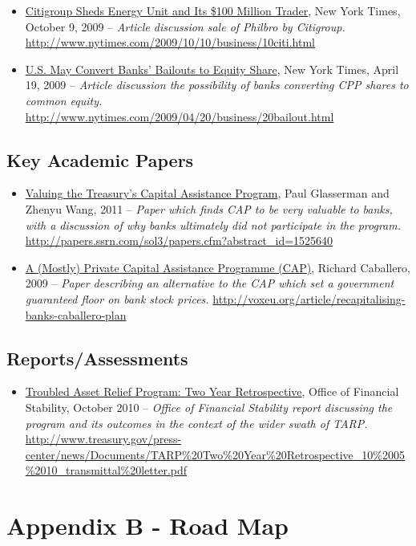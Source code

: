 \documentclass[12pt]{article}
\begin{document}
\begin{itemize}
\item
\ul{Citigroup Sheds Energy Unit and Its \$100 Million Trader}, New York Times, October 9,
  2009 -- \emph{Article discussion sale of Philbro by Citigroup.} \url{http://www.nytimes.com/2009/10/10/business/10citi.html}
\item
\ul{U.S. May Convert Banks’ Bailouts to Equity Share}, New York Times, April 19,
  2009 -- \emph{Article discussion the possibility of banks converting CPP shares to common equity.} \url{http://www.nytimes.com/2009/04/20/business/20bailout.html}
\end{itemize}

\subsection{Key Academic Papers}

\begin{itemize}
\item
\ul{Valuing the Treasury's Capital Assistance Program},
Paul Glasserman and Zhenyu Wang, 2011 -- \emph{Paper
which finds CAP to be very valuable to banks, with a discussion of why banks ultimately did not participate in the program.} \url{http://papers.ssrn.com/sol3/papers.cfm?abstract_id=1525640}
\item
\ul{A (Mostly) Private Capital Assistance Programme
(CAP)},
Richard Caballero, 2009 -- \emph{Paper describing an alternative to the CAP which set a government guaranteed floor on bank stock prices.} \url{http://voxeu.org/article/recapitalising-banks-caballero-plan}
\end{itemize}
\subsection{Reports/Assessments}

\begin{itemize}
\item
\ul{Troubled
  Asset Relief Program: Two Year Retrospective}, Office of Financial
  Stability, October 2010 -- \emph{Office of Financial Stability report
  discussing the program and its outcomes in the context of the wider
  swath of TARP.} \url{http://www.treasury.gov/press-center/news/Documents/TARP\%20Two\%20Year\%20Retrospective_10\%2005\%2010_transmittal\%20letter.pdf}
\end{itemize}

\section{Appendix B - Road Map}
\end{document}
